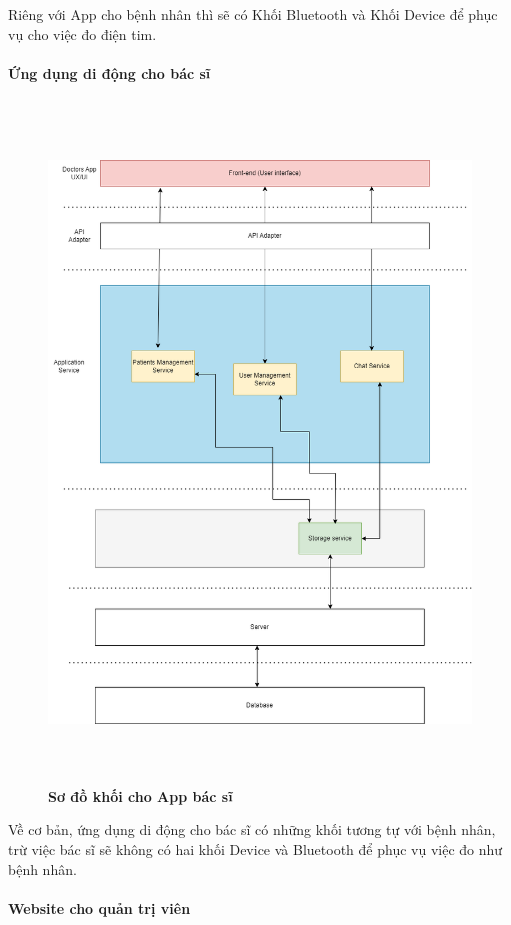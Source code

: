 Riêng với App cho bệnh nhân thì sẽ có Khối Bluetooth và Khối Device để phục vụ cho việc đo điện tim.
\paragraph{Ứng dụng di động cho bác sĩ}
\mbox{}

\begin{figure}[H]
  \centering
  \includegraphics[width=16cm,height=18cm]{Images/system/fmECG_architecture-Doctors.drawio.png}
  \caption[Sơ đồ khói cho App bác sĩ]{\bfseries \fontsize{12pt}{0pt}\selectfont Sơ đồ khối cho App bác sĩ}
  \label{fmECG_architecture-Doctors} %
\end{figure}

Về cơ bản, ứng dụng di động cho bác sĩ có những khối tương tự với bệnh nhân, trừ việc bác sĩ sẽ không có hai khối Device
và Bluetooth để phục vụ việc đo như bệnh nhân.


\paragraph{Website cho quản trị viên}
\mbox{}

